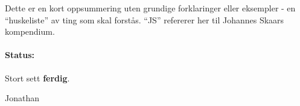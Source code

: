 \documentclass{article} %
\begin{document}
Dette er en kort oppsummering uten grundige forklaringer eller eksempler - en ``huskeliste'' av ting som skal forstås. ``JS'' refererer her til Johannes Skaars kompendium.
\paragraph{\color{Black} Status:} Stort sett {\color{Green} \bf ferdig}.
\begin{flushright}Jonathan\end{flushright}
	\setcounter{section}{1}

	

	

	

	

\end{document}
